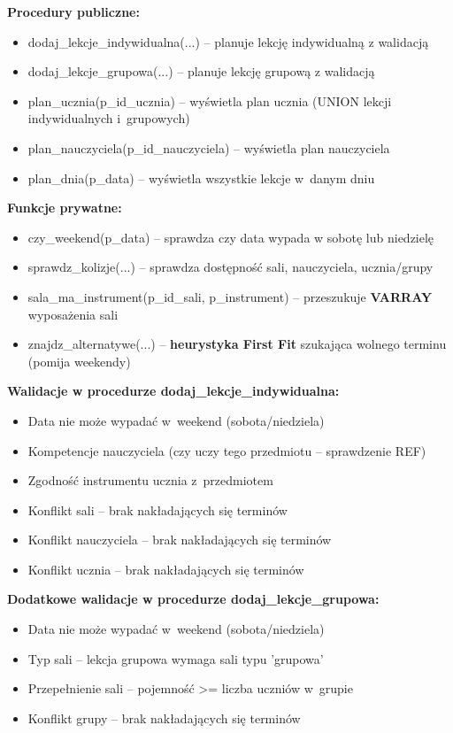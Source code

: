 \documentclass[12pt,a4paper]{article}
\begin{document}
\textbf{Procedury publiczne:}
\begin{itemize}[nosep]
    \item dodaj\_lekcje\_indywidualna(...) -- planuje lekcję indywidualną z walidacją
    \item dodaj\_lekcje\_grupowa(...) -- planuje lekcję grupową z walidacją
    \item plan\_ucznia(p\_id\_ucznia) -- wyświetla plan ucznia (UNION lekcji indywidualnych i~grupowych)
    \item plan\_nauczyciela(p\_id\_nauczyciela) -- wyświetla plan nauczyciela
    \item plan\_dnia(p\_data) -- wyświetla wszystkie lekcje w~danym dniu
\end{itemize}

\textbf{Funkcje prywatne:}
\begin{itemize}[nosep]
    \item czy\_weekend(p\_data) -- sprawdza czy data wypada w sobotę lub niedzielę
    \item sprawdz\_kolizje(...) -- sprawdza dostępność sali, nauczyciela, ucznia/grupy
    \item sala\_ma\_instrument(p\_id\_sali, p\_instrument) -- przeszukuje \textbf{VARRAY} wyposażenia sali
    \item znajdz\_alternatywe(...) -- \textbf{heurystyka First Fit} szukająca wolnego terminu (pomija weekendy)
\end{itemize}

\textbf{Walidacje w procedurze dodaj\_lekcje\_indywidualna:}
\begin{itemize}[nosep]
    \item Data nie może wypadać w~weekend (sobota/niedziela)
    \item Kompetencje nauczyciela (czy uczy tego przedmiotu -- sprawdzenie REF)
    \item Zgodność instrumentu ucznia z~przedmiotem
    \item Konflikt sali -- brak nakładających się terminów
    \item Konflikt nauczyciela -- brak nakładających się terminów
    \item Konflikt ucznia -- brak nakładających się terminów
\end{itemize}

\textbf{Dodatkowe walidacje w procedurze dodaj\_lekcje\_grupowa:}
\begin{itemize}[nosep]
    \item Data nie może wypadać w~weekend (sobota/niedziela)
    \item Typ sali -- lekcja grupowa wymaga sali typu 'grupowa'
    \item Przepełnienie sali -- pojemność >= liczba uczniów w~grupie
    \item Konflikt grupy -- brak nakładających się terminów
\end{itemize}
\end{document}
